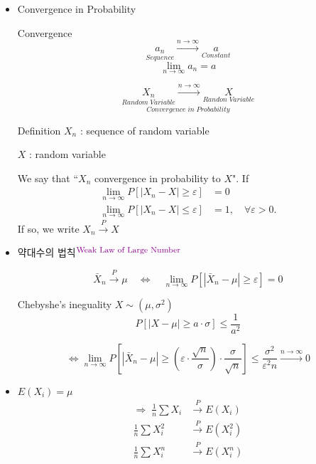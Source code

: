 \documentclass{oblivoir}
\newcommand{\DC}[1]{\textcolor{DarkMagenta}{#1}}%
\newcommand{\UP}[1]{$^{\mbox{\DC{\footnotesize #1}}}$}
\begin{document}
\begin{itemize}
\item
Convergence in Probability

\begin{myframe}{Convergence}
$$
\underset{Sequence}{a_n} \xrightarrow{n \rightarrow \infty} \underset{Constant}{a}
$$
$$
\lim_{n \rightarrow \infty } a_n = a
$$
\end{myframe}

$$
\underset{Convergence \; in \; Probability}{\underset{Random \; Variable}{X_n} \xrightarrow{n \rightarrow \infty} \underset{Randon \; Variable}{X}}
$$

\begin{myframe}{Definition}
$X_n$ : sequence of random variable

$X$ : random variable

We say that ``$X_n$ convergence in probability to $X$". If
\begin{align*}
\lim_{n \rightarrow \infty} P [ |X_n - X | \geq \varepsilon] &= 0\\
\lim_{n \rightarrow \infty} P [ |X_n - X | \leq \varepsilon] &= 1, \quad \forall \varepsilon > 0.
\end{align*}
If so, we write $X_n \overset{P}{\longrightarrow} X$
\end{myframe}

\item 
약대수의 법칙\UP{Weak Law of Large Number}

$$
\bar{X}_n \overset{P}{\longrightarrow} \mu \quad \Leftrightarrow \quad \lim_{n \rightarrow \infty} P [ |\bar{X}_n - \mu | \geq \varepsilon] = 0
$$

\begin{myframe}{Chebyshe's ineguality}
$X \sim (\mu, \sigma^2)$
$$
P[|X-\mu| \geq a \cdot \sigma] \leq \frac{1}{a^2}
$$
\end{myframe}

$$
\Leftrightarrow \lim_{n \rightarrow \infty} P\left[ |\bar{X}_n - \mu | \geq \left(\varepsilon \cdot \frac{\sqrt{n}}{\sigma}\right) \cdot \frac{\sigma}{\sqrt{n}}  \right] \leq \frac{\sigma^2}{\varepsilon^2 n} \xrightarrow{n \rightarrow \infty} 0
$$

\item
$E(X_i) = \mu$
\begin{align*}
\Rightarrow \; \frac{1}{n} \sum X_i &\overset{P}{\longrightarrow} E(X_i)\\
\frac{1}{n} \sum X_i^2 &\overset{P}{\longrightarrow} E(X_i^2)\\
\frac{1}{n} \sum X_i^n &\overset{P}{\longrightarrow} E(X_i^n)\\
\end{align*}


\end{itemize}
\end{document}
